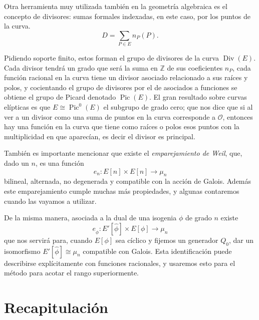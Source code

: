 \documentclass[a4paper]{book}
\theoremstyle{definition}
\theoremstyle{plain}
\newcommand{\ZZ}{\mathbb{Z}}
\newcommand{\OO}{\mathcal{O}}
\begin{document}
Otra herramienta muy utilizada también en la geometría algebraica es el concepto de divisores: sumas formales indexadas, en este caso, por los puntos de la curva.
\[
D = \sum_{P\in E} n_P (P).
\]

Pidiendo soporte finito, estos forman el grupo de divisores de la curva $\operatorname{Div}(E)$. Cada divisor tendrá un grado que será la suma en $\ZZ$ de sus coeficientes $n_P$, cada función racional en la curva tiene un divisor asociado relacionado a sus raíces y polos, y cocientando el grupo de divisores por el de asociados a funciones se obtiene el grupo de Picard denotado $\operatorname{Pic}(E)$. El gran resultado sobre curvas elípticas es que $E\cong \operatorname{Pic}^0(E)$ el subgrupo de grado cero; que nos dice que si al ver a un divisor como una suma de puntos en la curva corresponde a $\OO$, entonces hay una función en la curva que tiene como raíces o polos esos puntos con la multiplicidad en que aparecían, es decir el divisor es principal.

También es importante mencionar que existe el \emph{emparejamiento de Weil}, que, dado un $n$, es una función 
\[
e_n: E[n]\times E[n] \to \mu_n
\]
bilineal, alternada, no degenerada y compatible con la acción de Galois. Además este emparejamiento cumple muchas más propiedades, y algunas contaremos cuando las vayamos a utilizar. 

De la misma manera, asociada a la dual de una isogenia $\phi$ de grado $n$ existe
\[
e_{\hat\phi}: E'[\hat\phi]\times E[\phi] \to \mu_n
\]
que nos servirá para, cuando $E[\phi]$ sea cíclico y fijemos un generador $Q_0$, dar un isomorfismo $E'[\hat\phi]\cong \mu_n$ compatible con Galois. Esta identificación puede describirse explícitamente con funciones racionales, y usaremos esto para el método para acotar el rango superiormente.


\section{Recapitulación}
\end{document}
